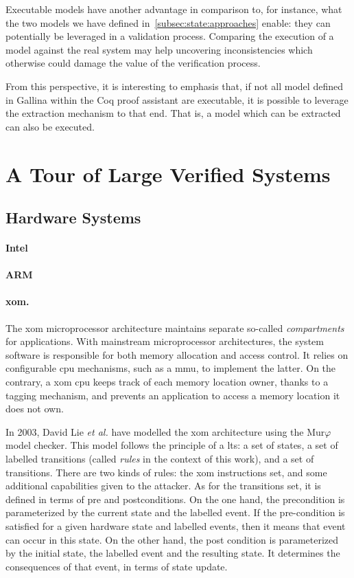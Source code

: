 Executable models have another advantage in comparison to, for instance, what
the two models we have defined in~\ref{subsec:state:approaches} enable: they can
potentially be leveraged in a validation process.
%
Comparing the execution of a model against the real system may help uncovering
inconsistencies which otherwise could damage the value of the verification
process.

From this perspective, it is interesting to emphasis that, if not all model
defined in {\sc Gallina} within the Coq proof assistant are executable, it is
possible to leverage the extraction mechanism to that end.
%
That is, a model which can be extracted can also be executed.

\section{A Tour of Large Verified Systems}

\subsection{Hardware Systems}

\paragraph{Intel}
%

\paragraph{ARM}
%

\paragraph{\ac{xom}.}
%
The \ac{xom} microprocessor architecture maintains separate so-called
\emph{compartments} for applications.
%
With mainstream microprocessor architectures, the system software is responsible
for both memory allocation and access control.
%
It relies on configurable \ac{cpu} mechanisms, such as a \ac{mmu}, to implement
the latter.
%
On the contrary, a \ac{xom} \ac{cpu} keeps track of each memory location owner,
thanks to a tagging mechanism, and prevents an application to access a memory
location it does not own.

In 2003, David Lie \emph{et al.} have modelled the \ac{xom} architecture using
the Mur$\varphi$ model checker.
%
This model follows the principle of a \ac{lts}: a set of states, a set of
labelled transitions (called \emph{rules} in the context of this work), and a
set of transitions.
%
There are two kinds of rules: the \ac{xom} instructions set, and some additional
capabilities given to the attacker.
%
As for the transitions set, it is defined in terms of pre and postconditions.
%
On the one hand, the precondition is parameterized by the current state and the
labelled event.
%
If the pre-condition is satisfied for a given hardware state and labelled
events, then it means that event can occur in this state.
%
On the other hand, the post condition is parameterized by the initial state, the
labelled event and the resulting state.
%
It determines the consequences of that event, in terms of state update.


